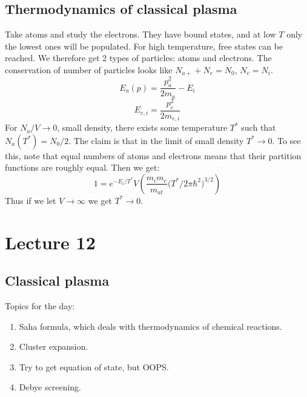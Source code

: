 \documentclass[12 pt]{article}
\begin{document}
\subsection*{Thermodynamics of classical plasma}
Take atoms and study the electrons. They have bound states, and at low $T$ only the lowest ones will be populated. For high temperature, free states can be reached. We therefore get 2 types of particles: atoms and electrons. The conservation of number of particles looks like $N_{a+} + N_e = N_0$, $N_e = N_i$.
\[     E_a (p) = \frac{p_a^2}{2m_a} - E_i   \]
\[    E_{e, i} = \frac{p_e^2}{2m_{e,i}}   \]
For $N_a/V \to 0$, small density, there exists some temperature $T^*$ such that $N_a(T^*) = N_0/2$. The claim is that in the limit of small density $T^* \to 0$. To see this, note that equal numbers of atoms and electrons means that their partition functions are roughly equal. Then we get:
\[   1 = e^{- E_i/T^*} V \left( \frac{m_im_e}{m_{at}}  \big( T^*/2\pi\hbar^2  \big)^{3/2}  \right)   \]
Thus if we let $V\to \infty$ we get $T^* \to 0$.


\section*{Lecture 12}
\subsection*{Classical plasma}
Topics for the day:
\begin{enumerate}
\item Saha formula, which deals with thermodynamics of chemical reactions.
\item Cluster expansion.
\item Try to get equation of state, but OOPS.
\item Debye screening.
\end{enumerate}
\end{document}
